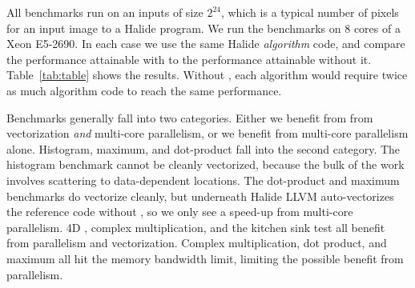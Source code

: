All benchmarks run on an inputs of size $2^{24}$, which is a typical number of pixels for an input image to a Halide program. We run the benchmarks on 8 cores of a Xeon E5-2690. In each case we use the same Halide \emph{algorithm} code, and compare the performance attainable with  to the performance attainable without it. Table~\ref{tab:table} shows the results. Without , each algorithm would require twice as much algorithm code to reach the same performance.

Benchmarks generally fall into two categories. Either we benefit from from vectorization \emph{and} multi-core parallelism, or we benefit from multi-core parallelism alone. Histogram, maximum, and dot-product fall into the second category. The histogram benchmark cannot be cleanly vectorized, because the bulk of the work involves scattering to data-dependent locations. The dot-product and maximum benchmarks do vectorize cleanly, but underneath Halide LLVM auto-vectorizes the reference code without , so we only see a speed-up from multi-core parallelism. 4D , complex multiplication, and the kitchen sink test all benefit from parallelism and vectorization. Complex multiplication, dot product, and maximum all hit the memory bandwidth limit, limiting the possible benefit from parallelism.



